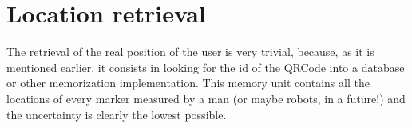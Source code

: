 \section{Location retrieval}
The retrieval of the real position of the user is very trivial, because, as it is mentioned earlier, it consists in looking for the id of the QRCode into a database or other memorization implementation.
This memory unit contains all the locations of every marker measured by a man (or maybe robots, in a future!) and the uncertainty is clearly the lowest possible.

